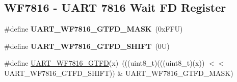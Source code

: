 \subsection*{W\+F7816 -\/ U\+A\+RT 7816 Wait FD Register}
\begin{DoxyCompactItemize}
\item 
\mbox{\label{group___u_a_r_t___register___masks_gafe82535b1014fd5cc4cfd50169d743ac}} 
\#define {\bfseries U\+A\+R\+T\+\_\+\+W\+F7816\+\_\+\+G\+T\+F\+D\+\_\+\+M\+A\+SK}~(0x\+F\+F\+U)
\item 
\mbox{\label{group___u_a_r_t___register___masks_ga721ba0567ed0305bffa0ee30353aa2c8}} 
\#define {\bfseries U\+A\+R\+T\+\_\+\+W\+F7816\+\_\+\+G\+T\+F\+D\+\_\+\+S\+H\+I\+FT}~(0\+U)
\item 
\#define \mbox{\hyperlink{group___u_a_r_t___register___masks_ga1deec30c17d2cc28d8db76346756785f}{U\+A\+R\+T\+\_\+\+W\+F7816\+\_\+\+G\+T\+FD}}(x)~(((uint8\+\_\+t)(((uint8\+\_\+t)(x)) $<$$<$ U\+A\+R\+T\+\_\+\+W\+F7816\+\_\+\+G\+T\+F\+D\+\_\+\+S\+H\+I\+FT)) \& U\+A\+R\+T\+\_\+\+W\+F7816\+\_\+\+G\+T\+F\+D\+\_\+\+M\+A\+SK)
\end{DoxyCompactItemize}

